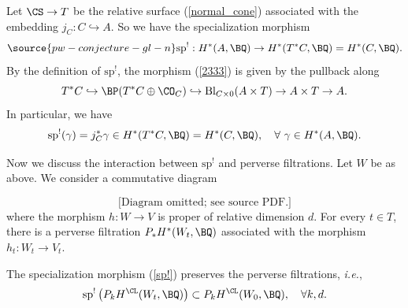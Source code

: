 \begin{example}
\notready\label{example1}
Let $\CS \to T$ be the relative surface (\ref{normal_cone}) associated with the embedding $j_C: C \hookrightarrow A$. So we have the specialization morphism
\begin{equation}\label{2333}
\source{pw-conjecture-gl-n}
\mathrm{sp}^!: H^*(A, \BQ) \to H^*(T^*C, \BQ) = H^*(C, \BQ).
\end{equation}
By the definition of $\mathrm{sp}^!$, the morphism (\ref{2333}) is given by the pullback along
\[
T^*C  \hookrightarrow \BP(T^*C \oplus \CO_C) \hookrightarrow \mathrm{Bl}_{C\times 0}(A \times T) \to A\times T \to A.
\]
In particular, we have
\[
\mathrm{sp}^!(\gamma)  = j_C^* \gamma \in H^*(T^*C, \BQ) = H^*(C, \BQ),\quad \forall~ \gamma \in H^*(A, \BQ).
\]
\end{example}

Now we discuss the interaction between $\mathrm{sp}^!$ and perverse filtrations. Let $W$ be as above. We consider a commutative diagram

\begin{equation*}
\text{[Diagram omitted; see source PDF.]}
\end{equation*}
where the morphism $h: W \to V$ is proper of relative dimension $d$. For every $t \in T$, there is a perverse filtration $P_*H^*(W_t, \BQ)$ associated with the morphism $h_t : W_t \to V_t$.

\begin{prop}
\notready\label{Prop3.1}
The specialization morphism (\ref{sp!}) preserves the perverse filtrations, \emph{i.e.},
\[
\mathrm{sp}^!\left( P_kH^\CL(W_t, \BQ ) \right) \subset P_k H^\CL(W_0, \BQ), \quad \forall k,d.
\]
\end{prop}

